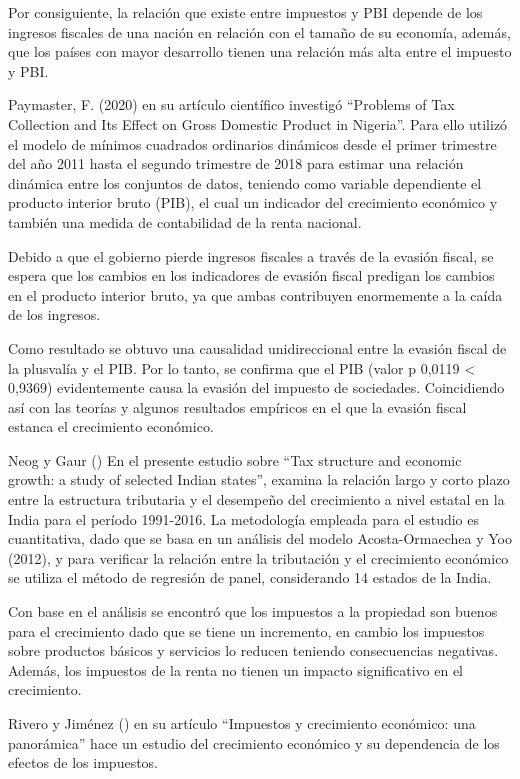 \documentclass[
  jou,
  floatsintext,
  longtable,
  a4paper,
  nolmodern,
  notxfonts,
  notimes,
  12pt,
  colorlinks=true,linkcolor=blue,citecolor=blue,urlcolor=blue]{apa7}
\begin{document}
Por consiguiente, la relación que existe entre impuestos y PBI depende
de los ingresos fiscales de una nación en relación con el tamaño de su
economía, además, que los países con mayor desarrollo tienen una
relación más alta entre el impuesto y PBI.

Paymaster, F. (2020) en su artículo científico investigó ``Problems of
Tax Collection and Its Effect on Gross Domestic Product in Nigeria''.
Para ello utilizó el modelo de mínimos cuadrados ordinarios dinámicos
desde el primer trimestre del año 2011 hasta el segundo trimestre de
2018 para estimar una relación dinámica entre los conjuntos de datos,
teniendo como variable dependiente el producto interior bruto (PIB), el
cual un indicador del crecimiento económico y también una medida de
contabilidad de la renta nacional.

Debido a que el gobierno pierde ingresos fiscales a través de la evasión
fiscal, se espera que los cambios en los indicadores de evasión fiscal
predigan los cambios en el producto interior bruto, ya que ambas
contribuyen enormemente a la caída de los ingresos.

Como resultado se obtuvo una causalidad unidireccional entre la evasión
fiscal de la plusvalía y el PIB. Por lo tanto, se confirma que el PIB
(valor p 0,0119 \textless{} 0,9369) evidentemente causa la evasión del
impuesto de sociedades. Coincidiendo así con las teorías y algunos
resultados empíricos en el que la evasión fiscal estanca el crecimiento
económico.

Neog y Gaur () En el presente estudio
sobre ``Tax structure and economic growth: a study of selected Indian
states'', examina la relación largo y corto plazo entre la estructura
tributaria y el desempeño del crecimiento a nivel estatal en la India
para el período 1991-2016. La metodología empleada para el estudio es
cuantitativa, dado que se basa en un análisis del modelo
Acosta-Ormaechea y Yoo (2012), y para verificar la relación entre la
tributación y el crecimiento económico se utiliza el método de regresión
de panel, considerando 14 estados de la India.

Con base en el análisis se encontró que los impuestos a la propiedad son
buenos para el crecimiento dado que se tiene un incremento, en cambio
los impuestos sobre productos básicos y servicios lo reducen teniendo
consecuencias negativas. Además, los impuestos de la renta no tienen un
impacto significativo en el crecimiento.

Rivero y Jiménez () en su
artículo ``Impuestos y crecimiento económico: una panorámica'' hace un
estudio del crecimiento económico y su dependencia de los efectos de los
impuestos.
\end{document}
